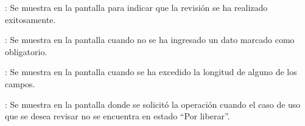 \begin{description}
	
	\item {}: Se muestra en la pantalla  para indicar que la revisión se ha realizado exitosamente.
	
	\item {}: Se muestra en la pantalla  cuando no se ha ingresado un dato marcado como obligatorio.
	
	\item {}: Se muestra en la pantalla  cuando se ha excedido la longitud de alguno de los campos.
	
	\item {}: Se muestra en la pantalla donde se solicitó la operación cuando el caso de uso que se desea revisar no se encuentra en estado ``Por liberar''.
	
\end{description}
